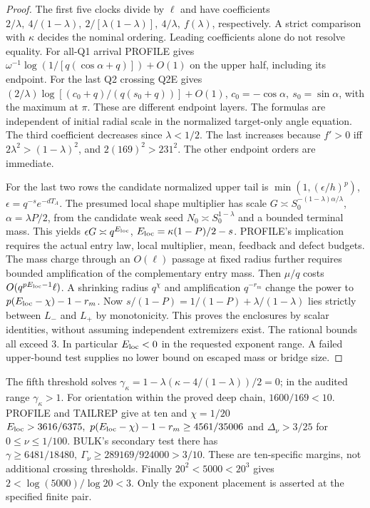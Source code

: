 \documentclass[11pt]{article}
\begin{document}
\begin{proof}
The first five clocks divide by \(\ell\) and have coefficients
\(2/\lambda,\ 4/(1-\lambda),\ 2/[\lambda(1-\lambda)],\
4/\lambda,\ f(\lambda)\), respectively. A strict comparison with
\(\kappa\) decides the nominal ordering. Leading coefficients alone
do not resolve equality. For all-Q1 arrival PROFILE gives
\(\omega^{-1}\log(1/[q(\cos\alpha+q)])+O(1)\) on the upper half,
including its endpoint. For the last Q2 crossing Q2E gives
\((2/\lambda)\log[(c_0+q)/(q(s_0+q))]+O(1)\),
\(c_0=-\cos\alpha,\ s_0=\sin\alpha\), with the maximum at \(\pi\).
These are different endpoint layers. The formulas are independent of
initial radial scale in the normalized target-only angle equation.
The third coefficient decreases since \(\lambda<1/2\).
The last increases because \(f'>0\) iff \(2\lambda^2>(1-\lambda)^2\),
and \(2(169)^2>231^2\). The other endpoint orders are immediate.

For the last two rows the candidate normalized upper tail is
\(\min(1,(\epsilon/h)^p)\), \(\epsilon=q^{-s}e^{-dT_A}\).
The presumed local shape multiplier has scale
\(G\asymp S_0^{-(1-\lambda)\alpha/\lambda}\),
\(\alpha=\lambda P/2\), from the candidate weak seed
\(N_0\asymp S_0^{1-\lambda}\) and a bounded terminal mass.
This yields \(\epsilon G\asymp q^{E_{\rm loc}}\),
\(E_{\rm loc}=\kappa(1-P)/2-s\). PROFILE's implication requires
the actual entry law, local multiplier, mean, feedback and defect budgets.
The mass charge through an \(O(\ell)\) passage at fixed radius further
requires bounded amplification of the complementary entry mass.
Then \(\mu/q\) costs \(O(q^{pE_{\rm loc}-1}\ell)\).
A shrinking radius \(q^\chi\) and amplification \(q^{-r_m}\) change the
power to \(p(E_{\rm loc}-\chi)-1-r_m\).
Now \(s/(1-P)=1/(1-P)+\lambda/(1-\lambda)\) lies strictly
between \(L_-\) and \(L_+\) by monotonicity. This proves the enclosures
by scalar identities, without assuming independent extremizers exist.
The rational bounds all exceed 3. In particular \(E_{\rm loc}<0\) in
the requested exponent range. A failed upper-bound test supplies no
lower bound on escaped mass or bridge size.
\end{proof}
The fifth threshold solves
\(\gamma_\kappa=1-\lambda(\kappa-4/(1-\lambda))/2=0\);
in the audited range \(\gamma_\kappa>1\).
For orientation within the proved deep chain, \(1600/169<10\).
PROFILE and TAILREP give at ten and \(\chi=1/20\)
\(E_{\rm loc}>3616/6375,\ p(E_{\rm loc}-\chi)-1-r_m\ge4561/35006\)
and \(\Delta_\nu>3/25\) for \(0\le\nu\le1/100\). BULK's secondary
test there has \(\gamma\ge6481/18480,\
\Gamma_\nu\ge289169/924000>3/10\). These are ten-specific margins,
not additional crossing thresholds. Finally \(20^2<5000<20^3\)
gives \(2<\log(5000)/\log20<3\). Only the exponent placement is
asserted at the specified finite pair.
\end{document}
